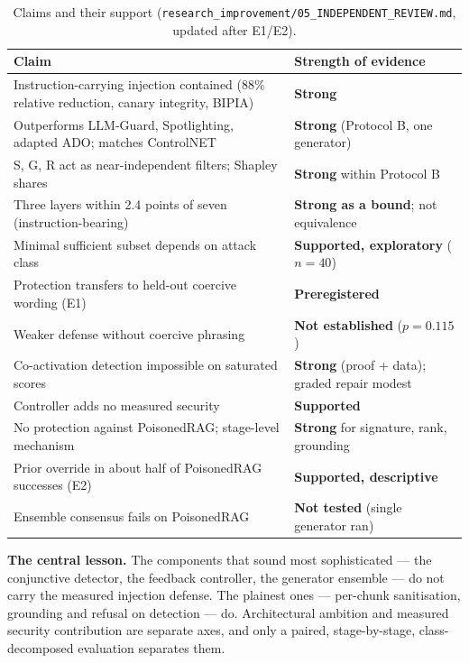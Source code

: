 \documentclass[11pt,a4paper]{article}
\begin{document}
\begin{table}[h]
\centering\small
\begin{tabularx}{\linewidth}{@{}Y l@{}}
\toprule
Claim & Strength of evidence \\
\midrule
Instruction-carrying injection contained (88\% relative reduction, canary integrity, BIPIA) & \textcolor{good}{\textbf{Strong}} \\
Outperforms LLM-Guard, Spotlighting, adapted ADO; matches ControlNET & \textcolor{good}{\textbf{Strong}} (Protocol B, one generator) \\
S, G, R act as near-independent filters; Shapley shares & \textcolor{good}{\textbf{Strong}} within Protocol B \\
Three layers within 2.4 points of seven (instruction-bearing) & \textcolor{good}{\textbf{Strong as a bound}}; not equivalence \\
Minimal sufficient subset depends on attack class & \textcolor{mid}{\textbf{Supported, exploratory}} ($n=40$) \\
Protection transfers to held-out coercive wording (E1) & \textcolor{good}{\textbf{Preregistered}} \\
Weaker defense without coercive phrasing & \textcolor{mid}{\textbf{Not established}} ($p=0.115$) \\
Co-activation detection impossible on saturated scores & \textcolor{good}{\textbf{Strong}} (proof + data); graded repair modest \\
Controller adds no measured security & \textcolor{good}{\textbf{Supported}} \\
No protection against PoisonedRAG; stage-level mechanism & \textcolor{good}{\textbf{Strong}} for signature, rank, grounding \\
Prior override in about half of PoisonedRAG successes (E2) & \textcolor{mid}{\textbf{Supported, descriptive}} \\
Ensemble consensus fails on PoisonedRAG & \textcolor{bad}{\textbf{Not tested}} (single generator ran) \\
\bottomrule
\end{tabularx}
\caption{Claims and their support (\texttt{research\_improvement/05\_INDEPENDENT\_REVIEW.md}, updated after E1/E2).}
\end{table}

\textbf{The central lesson.} The components that sound most sophisticated --- the conjunctive detector, the
feedback controller, the generator ensemble --- do not carry the measured injection defense. The plainest ones ---
per-chunk sanitisation, grounding and refusal on detection --- do. Architectural ambition and measured security
contribution are separate axes, and only a paired, stage-by-stage, class-decomposed evaluation separates them.
\end{document}
